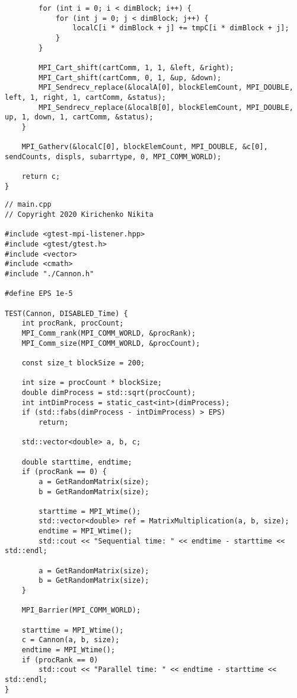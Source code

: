 \documentclass{report}
\begin{document}
\begin{lstlisting}
        for (int i = 0; i < dimBlock; i++) {
            for (int j = 0; j < dimBlock; j++) {
                localC[i * dimBlock + j] += tmpC[i * dimBlock + j];
            }
        }

        MPI_Cart_shift(cartComm, 1, 1, &left, &right);
        MPI_Cart_shift(cartComm, 0, 1, &up, &down);
        MPI_Sendrecv_replace(&localA[0], blockElemCount, MPI_DOUBLE, left, 1, right, 1, cartComm, &status);
        MPI_Sendrecv_replace(&localB[0], blockElemCount, MPI_DOUBLE, up, 1, down, 1, cartComm, &status);
    }

    MPI_Gatherv(&localC[0], blockElemCount, MPI_DOUBLE, &c[0], sendCounts, displs, subarrtype, 0, MPI_COMM_WORLD);

    return c;
}

\end{lstlisting}
\begin{lstlisting}
// main.cpp
// Copyright 2020 Kirichenko Nikita

#include <gtest-mpi-listener.hpp>
#include <gtest/gtest.h>
#include <vector>
#include <cmath>
#include "./Cannon.h"

#define EPS 1e-5

TEST(Cannon, DISABLED_Time) {
    int procRank, procCount;
    MPI_Comm_rank(MPI_COMM_WORLD, &procRank);
    MPI_Comm_size(MPI_COMM_WORLD, &procCount);

    const size_t blockSize = 200;

    int size = procCount * blockSize;
    double dimProcess = std::sqrt(procCount);
    int intDimProcess = static_cast<int>(dimProcess);
    if (std::fabs(dimProcess - intDimProcess) > EPS)
        return;

    std::vector<double> a, b, c;

    double starttime, endtime;
    if (procRank == 0) {
        a = GetRandomMatrix(size);
        b = GetRandomMatrix(size);

        starttime = MPI_Wtime();
        std::vector<double> ref = MatrixMultiplication(a, b, size);
        endtime = MPI_Wtime();
        std::cout << "Sequential time: " << endtime - starttime << std::endl;

        a = GetRandomMatrix(size);
        b = GetRandomMatrix(size);
    }

    MPI_Barrier(MPI_COMM_WORLD);

    starttime = MPI_Wtime();
    c = Cannon(a, b, size);
    endtime = MPI_Wtime();
    if (procRank == 0)
        std::cout << "Parallel time: " << endtime - starttime << std::endl;
}


\end{lstlisting}
\end{document}
